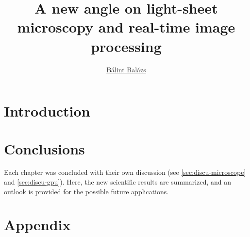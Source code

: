 \documentclass{diploma_style}
\author{\href{mailto:balint.balazs@embl.de}{Bálint Balázs}}
\title{A new angle on light-sheet microscopy and real-time image processing}
\begin{document}
\pagestyle{plain}

\maketitle
{}





\tableofcontents
\pagestyle{fancy}


\listoffigures
{}

\listoftables
{}

\glsaddall[types={\acronymtype}]
\printglossary[type=\acronymtype, title=List of Abbreviations, toctitle=List of Abbreviations]



\cleardoublepage
\setcounter{page}{1}

\chapter*{Introduction}

\cleardoublepage










\chapter{Conclusions}

Each chapter was concluded with their own discussion (see \autoref{sec:discu-microscope} and \autoref{sec:discu-gpu}). Here, the new scientific results are summarized, and an outlook is provided for the possible future applications.

\graphicspath{{./}}
\label{ch:discussion}




\chapter*{Appendix}
\setcounter{table}{0}
\setcounter{figure}{0}
\setcounter{section}{0}
\renewcommand{\thesection}{\Alph{section}}
\renewcommand{\thetable}{\Alph{section}\arabic{table}}
\renewcommand{\thefigure}{\Alph{section}\arabic{figure}}
\end{document}
